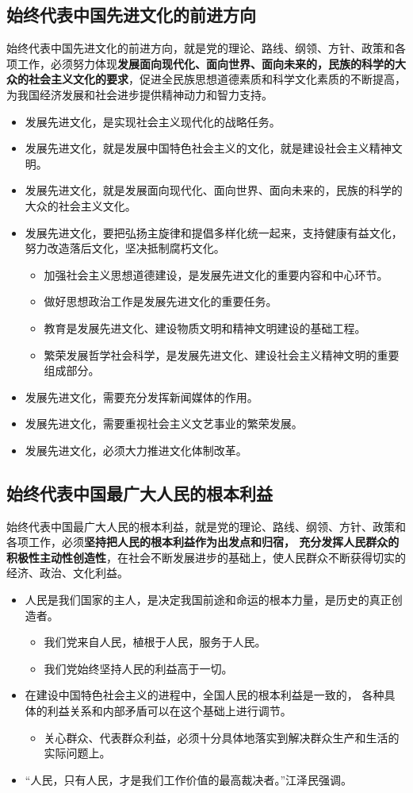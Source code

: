 \documentclass[12pt,openany]{ctexbook}
\begin{document}
\subsection{始终代表中国先进文化的前进方向}
始终代表中国先进文化的前进方向，就是党的理论、路线、纲领、方针、政策和各项工作，必须努力体现\textbf{发展面向现代化、面向世界、面向未来的，民族的科学的大众的社会主义文化的要求}，促进全民族思想道德素质和科学文化素质的不断提高，为我国经济发展和社会进步提供精神动力和智力支持。
\begin{itemize}
  \item 发展先进文化，是实现社会主义现代化的战略任务。
  \item 发展先进文化，就是发展中国特色社会主义的文化，就是建设社会主义精神文明。
  \item 发展先进文化，就是发展面向现代化、面向世界、面向未来的，民族的科学的大众的社会主义文化。
  \item 发展先进文化，要把弘扬主旋律和提倡多样化统一起来，支持健康有益文化，努力改造落后文化，坚决抵制腐朽文化。
\begin{itemize}
  \item 加强社会主义思想道德建设，是发展先进文化的重要内容和中心环节。
  \item 做好思想政治工作是发展先进文化的重要任务。
  \item 教育是发展先进文化、建设物质文明和精神文明建设的基础工程。
  \item 繁荣发展哲学社会科学，是发展先进文化、建设社会主义精神文明的重要组成部分。
\end{itemize}
  \item 发展先进文化，需要充分发挥新闻媒体的作用。
  \item 发展先进文化，需要重视社会主义文艺事业的繁荣发展。
  \item 发展先进文化，必须大力推进文化体制改革。
\end{itemize}
\subsection{始终代表中国最广大人民的根本利益}
始终代表中国最广大人民的根本利益，就是党的理论、路线、纲领、方针、政策和各项工作，必须\textbf{坚持把人民的根本利益作为出发点和归宿， 充分发挥人民群众的积极性主动性创造性}，在社会不断发展进步的基础上，使人民群众不断获得切实的经济、政治、文化利益。
\begin{itemize}
  \item 人民是我们国家的主人，是决定我国前途和命运的根本力量，是历史的真正创造者。
\begin{itemize}
  \item 我们党来自人民，植根于人民，服务于人民。
  \item 我们党始终坚持人民的利益高于一切。
\end{itemize}
  \item 在建设中国特色社会主义的进程中，全国人民的根本利益是一致的， 各种具体的利益关系和内部矛盾可以在这个基础上进行调节。
\begin{itemize}
  \item 关心群众、代表群众利益，必须十分具体地落实到解决群众生产和生活的实际问题上。
\end{itemize}
  \item “人民，只有人民，才是我们工作价值的最高裁决者。”江泽民强调。
\end{itemize}
\end{document}

